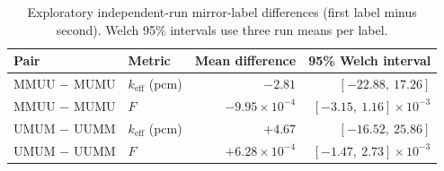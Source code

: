 \documentclass[conference]{IEEEtran}
\begin{document}
\begin{table}[t]
\caption{Exploratory independent-run mirror-label differences (first label minus second). Welch 95\% intervals use three run means per label.}
\label{tab:mirror}
\centering
\small
\setlength{\tabcolsep}{6pt}
\begin{tabular}{l l r r}
\toprule
Pair & Metric & Mean difference & 95\% Welch interval \\
\midrule
MMUU $-$ MUMU & $k_{\mathrm{eff}}$ (pcm) & $-2.81$ & $[-22.88,\ 17.26]$ \\
MMUU $-$ MUMU & $F$ & $-9.95\times10^{-4}$ & $[-3.15,\ 1.16]\times10^{-3}$ \\
UMUM $-$ UUMM & $k_{\mathrm{eff}}$ (pcm) & $+4.67$ & $[-16.52,\ 25.86]$ \\
UMUM $-$ UUMM & $F$ & $+6.28\times10^{-4}$ & $[-1.47,\ 2.73]\times10^{-3}$ \\
\bottomrule
\end{tabular}
\end{table}
\end{document}
